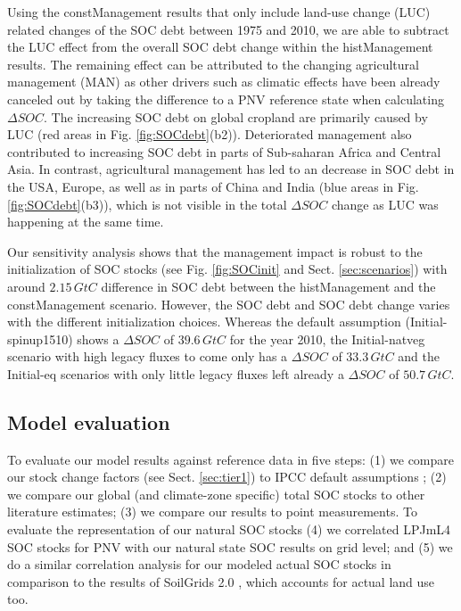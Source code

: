 \documentclass[gc, manuscript]{copernicus}
\begin{document}
Using the constManagement results that only include land-use change (LUC) related changes of the SOC debt between 1975 and 2010, we are able to subtract the LUC effect from the overall SOC debt change within the histManagement results. The remaining effect can be attributed to the changing agricultural management (MAN) as other drivers such as climatic effects have been already canceled out by taking the difference to a PNV reference state when calculating \(\Delta SOC\).
The increasing SOC debt on global cropland are primarily caused by LUC (red areas in Fig. \ref{fig:SOCdebt}(b2)). Deteriorated management also contributed to increasing SOC debt in parts of Sub-saharan Africa and Central Asia. In contrast, agricultural management has led to an decrease in SOC debt in the USA, Europe, as well as in parts of China and India (blue areas in Fig. \ref{fig:SOCdebt}(b3)), which is not visible in the total \(\Delta SOC\) change as LUC was happening at the same time.

Our sensitivity analysis shows that the management impact is robust to the initialization of SOC stocks (see Fig. \ref{fig:SOCinit} and Sect. \ref{sec:scenarios}) with around \(2.15\,\unit{GtC}\) difference in SOC debt between the histManagement and the constManagement scenario. However, the SOC debt and SOC debt change varies with the different initialization choices. Whereas the default assumption (Initial-spinup1510) shows a \(\Delta SOC\) of \(39.6\,\unit{GtC}\) for the year 2010, the Initial-natveg scenario with high legacy fluxes to come only has a \(\Delta SOC\) of \(33.3\,\unit{GtC}\) and the Initial-eq scenarios with only little legacy fluxes left already a \(\Delta SOC\) of \(50.7\,\unit{GtC}\).

\hypertarget{sec:validate}{%
\subsection{Model evaluation}\label{sec:validate}}

To evaluate our model results against reference data in five steps: (1) we compare our stock change factors (see Sect. \ref{sec:tier1}) to IPCC default assumptions \citep{lasco_cropland_in_ipcc_2006, ogle_cropland_in_ipcc_2019}; (2) we compare our global (and climate-zone specific) total SOC stocks to other literature estimates; (3) we compare our results to point measurements. To evaluate the representation of our natural SOC stocks (4) we correlated LPJmL4 SOC stocks for PNV with our natural state SOC results on grid level; and (5) we do a similar correlation analysis for our modeled actual SOC stocks in comparison to the results of SoilGrids 2.0 \citep{poggio_soilgrids_2021}, which accounts for actual land use too.
\end{document}
